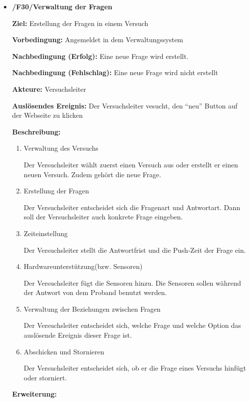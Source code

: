 \documentclass[a4paper]{scrreprt}
\begin{document}
\begin{itemize}
	            \item \textbf{/F30/Verwaltung der Fragen }
	            \par \textbf{Ziel: }Erstellung der Fragen in einem Versuch
	            \par \textbf{Vorbedingung: } Angemeldet in dem Verwaltungssystem
	            \par \textbf{Nachbedingung (Erfolg): }Eine neue Frage wird erstellt.
	            \par \textbf{Nachbedingung (Fehlschlag): }Eine neue Frage wird nicht erstellt
	            \par \textbf{Akteure: }Versuchsleiter
	            \par \textbf{Auslösendes Ereignis: }Der Versuchsleiter vesucht, den ``neu'' Button auf der Webseite zu klicken
	            \par \textbf{Beschreibung: }
	            \begin{enumerate}
	            	\item Verwaltung des Versuchs
	            	\par Der Versuchsleiter wählt zuerst einen Versuch aus oder erstellt er einen neuen Versuch. Zudem gehört die neue Frage.
	            	\item Erstellung der Fragen
	            	\par Der Versuchsleiter entscheidet sich die Fragenart und Antwortart. Dann soll der Versuchsleiter auch konkrete Frage eingeben.
	            	\item Zeiteinstellung
	            	\par Der Versuchsleiter stellt die Antwortfrist und die Push-Zeit der Frage ein.
	            	\item Hardwareunterstützung(bzw. Sensoren)
	            	\par Der Versuchsleiter fügt die Sensoren hinzu. Die Sensoren sollen während der Antwort von dem Proband benutzt werden.
                    \item Verwaltung der Beziehungen zwischen Fragen
                    \par Der Versuchsleiter entscheidet sich, welche Frage und welche Option das auslösende Ereignis dieser Frage ist.
	            	\item Abschicken und Stornieren
	            	\par Der Versuchsleiter entscheidet sich, ob er die Frage eines Versuchs hinfügt oder storniert.
	            \end{enumerate}
	            \par \textbf{Erweiterung: }

\end{itemize}
\end{document}
